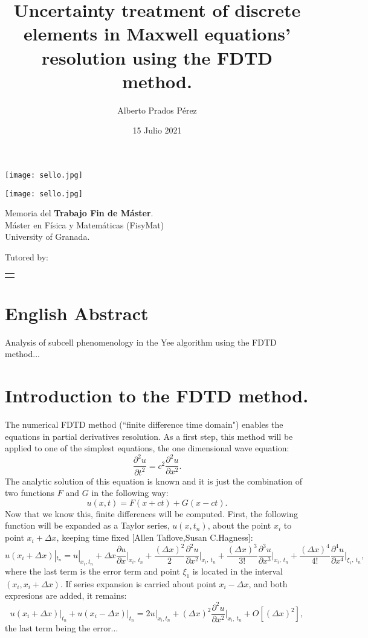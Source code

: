 \documentclass[12pt, oneside]{book}
\title{Uncertainty treatment of discrete elements in Maxwell equations' resolution using the FDTD method.}
\author{Alberto Prados Pérez}
\date{15 Julio 2021}
\makeatletter
\renewcommand\maketitle{%
  \begin{titlepage}
      \vspace*{1.5cm}
      \parskip=0pt
      \Huge\bfseries
      \begin{center}
          \leavevmode\texttt{[image: sello.jpg]}\\[2cm]
          \@title
      \end{center}
      \vspace{1cm}
      \begin{center}
          \@author
      \end{center}
  \end{titlepage}
  
  \begin{titlepage}
  \parindent=0pt
  \begin{flushleft}
  \vspace*{1.5mm}
  \setlength\baselineskip{0pt}
  \setlength\parskip{0mm}
  \begin{center}
      \leavevmode\texttt{[image: sello.jpg]}
  \end{center}
  \end{flushleft}
  \vspace{1cm}
  \bgroup
  \Large \bfseries
  \begin{center}
  \@title
  \end{center}
  \egroup
  \vspace*{.5cm}
  \begin{center}
  \@author
  \end{center}
  \vspace*{1.8cm}
  \begin{flushright}
  \begin{minipage}{8.45cm}
      Memoria del {\bf Trabajo Fin de Máster}.\\ 
      Máster en Física y Matemáticas (FisyMat) \\ 
      University of Granada.

      \vspace*{7.5mm}

      Tutored by:
  \end{minipage}\par
  \begin{tabularx}{8.45cm}[b]{@{}l}
      \guardatutores
  \end{tabularx}
   \end{flushright}
      \vspace*{\fill}
   \end{titlepage}
   \pagestyle{tfg}
   \renewcommand{\chaptermark}[1]{\markright{\thechapter.\space ##1}}
   \renewcommand{\sectionmark}[1]{}
   \renewcommand{\subsectionmark}[1]{}
  }
\makeatother
\begin{document}
\maketitle

\frontmatter
\tableofcontents

\mainmatter

\chapter*{English Abstract}



\begin{otherlanguage}{english}
    Analysis of subcell phenomenology in the Yee algorithm using the FDTD method...
\end{otherlanguage}



\chapter{Introduction to the FDTD method.}

The numerical FDTD method (``finite difference time domain") enables the equations in partial derivatives resolution. As a first step, this method will be applied to one of the simplest equations, the one dimensional wave equation:
\begin{equation}
\frac{\partial^2 u}{\partial t^2}= c^2 \frac{\partial^2 u}{\partial x^2}.
\end{equation}
The analytic solution of this equation is known and it is just the combination of two functions $F$ and $G$ in the following way:
\begin{equation}
u(x,t)= F(x+ct)+G(x-ct).
\end{equation}
\indent Now that we know this, finite differences will be computed. First, the following function will be expanded as a Taylor series, $u(x,t_n)$, about the point $x_i$ to point $x_i+\Delta x$, keeping time fixed [Allen Taflove,Susan C.Hagness]:
\begin{equation}
u(x_i+\Delta x)|_{t_n} = u|_{x_i,t_n} + \Delta x \frac{\partial u}{\partial x} \bigg |_{x_i,\: t_n} + \frac{\left(\Delta x\right)^2}{2}\frac{\partial^2 u}{\partial x^2}\bigg |_{x_i,\: t_n} +\frac{\left(\Delta x\right)^3}{3!}\frac{\partial^3 u}{\partial x^3}\bigg |_{x_i,\: t_n} + \frac{\left(\Delta x\right)^4}{4!}\frac{\partial^4 u}{\partial x^4}\bigg |_{\xi_1,\: t_n},
\end{equation} 
where the last term is the error term and point $\xi_1$ is located in the interval $(x_i, x_i+\Delta x)$. If series expansion is carried about point $x_i - \Delta x$, and both expresions are added, it remains:
\begin{equation}
u(x_i+\Delta x) \bigg |_{t_n}+u(x_i-\Delta x) \bigg |_{t_n}=2u|_{x_i,t_n}+\left(\Delta x\right)^2\frac{\partial^2 u}{\partial x^2}\bigg |_{x_i,\: t_n} + O\left[ \left( \Delta x\right)^2\right],
\end{equation}
the last term being the error...
\end{document}
